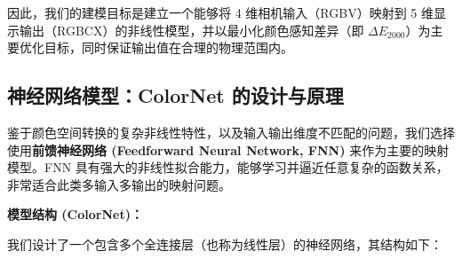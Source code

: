 因此，我们的建模目标是建立一个能够将 4 维相机输入（RGBV）映射到 5 维显示输出（RGBCX）的非线性模型，并以最小化颜色感知差异（即 $\Delta E_{2000}$）为主要优化目标，同时保证输出值在合理的物理范围内。

\subsection[\hspace{-2pt}神经网络模型：ColorNet 的设计与原理]{{\heiti{} \hspace{-8pt}神经网络模型：ColorNet 的设计与原理}}\label{section2: 神经网络模型}

鉴于颜色空间转换的复杂非线性特性，以及输入输出维度不匹配的问题，我们选择使用\textbf{前馈神经网络 (Feedforward Neural Network, FNN)} 来作为主要的映射模型。FNN 具有强大的非线性拟合能力，能够学习并逼近任意复杂的函数关系，非常适合此类多输入多输出的映射问题。

\textbf{模型结构 (ColorNet)：}

我们设计了一个包含多个全连接层（也称为线性层）的神经网络，其结构如下：


